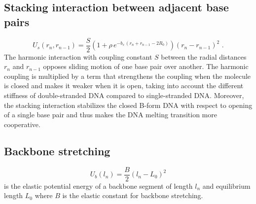 \documentclass[12pt,masters,final]{UTRGVthesis}
\begin{document}
\subsection{Stacking interaction between adjacent base pairs}
%
  \begin{equation} \label{stacking}
    U_s(r_n,r_{n-1}) = \frac{S}{2}
    \left(1 + \rho \, e^{-b_s \, \left(r_n + r_{n-1} - 2 R_0\right)} \right) \left(r_n - r_{n-1} \right)^2 \, \, .  
  \end{equation}
  The harmonic interaction with coupling constant $S$ between the radial distances $r_n$ and
  $r_{n-1}$ opposes sliding motion of one base pair over another. The harmonic coupling is
  multiplied by a term that strengthens the coupling when the molecule is closed and makes
  it weaker when it is open, taking into account the different stiffness of double-stranded DNA
  compared to single-stranded DNA. Moreover, the stacking interaction stabilizes the
  closed B-form DNA with respect to opening of a single base pair and thus makes the
  DNA melting transition more cooperative.\\
%
\subsection{Backbone stretching}
%
  \begin{equation} \label{backbone}
    U_b(l_n) = \frac{B}{2} \left(l_n - L_0 \right)^2
  \end{equation}
  is the elastic potential energy of a backbone segment of length $l_n$
  and equilibrium length $L_0$ where $B$ is the elastic constant for backbone stretching. 
%
\newpage
\end{document}
